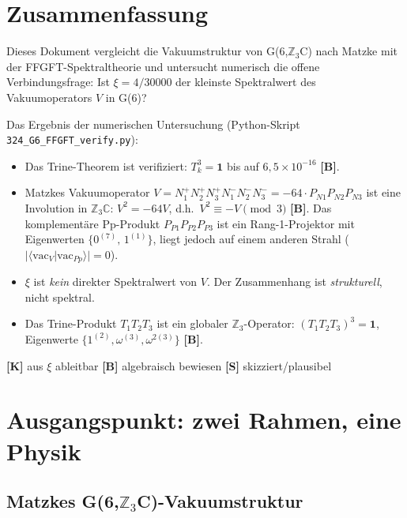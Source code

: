 \section*{Zusammenfassung}

Dieses Dokument vergleicht die Vakuumstruktur von G(6,$\mathbb{Z}_3$C) nach Matzke
mit der FFGFT-Spektraltheorie und untersucht numerisch die offene
Verbindungsfrage: Ist $\xi = 4/30000$ der kleinste Spektralwert des
Vakuumoperators $V$ in G(6)?

Das Ergebnis der numerischen Untersuchung (Python-Skript
\texttt{324\_G6\_FFGFT\_verify.py}):

\begin{itemize}
  \item Das Trine-Theorem ist verifiziert: $T_k^3 = \mathbf{1}$
    bis auf $6{,}5\times10^{-16}$ \textbf{[B]}.
  \item Matzkes Vakuumoperator $V = N_1^+N_2^+N_3^+N_1^-N_2^-N_3^- = -64\cdot P_{N1}P_{N2}P_{N3}$
    ist eine Involution in $\mathbb{Z}_3\mathbb{C}$: $V^2 = -64V$,
    d.h.\ $V^2 \equiv -V \pmod{3}$ \textbf{[B]}.
    Das komplementäre Pp-Produkt $P_{P1}P_{P2}P_{P3}$ ist ein Rang-1-Projektor
    mit Eigenwerten $\{0^{(7)},\, 1^{(1)}\}$, liegt jedoch auf einem anderen Strahl
    ($|\langle\text{vac}_V|\text{vac}_{Pp}\rangle| = 0$).
  \item $\xi$ ist \emph{kein} direkter Spektralwert von $V$.
    Der Zusammenhang ist \emph{strukturell}, nicht spektral.
  \item Das Trine-Produkt $T_1 T_2 T_3$ ist ein globaler
    $\mathbb{Z}_3$-Operator: $(T_1 T_2 T_3)^3 = \mathbf{1}$,
    Eigenwerte $\{1^{(2)}, \omega^{(3)}, \omega^{2(3)}\}$ \textbf{[B]}.
\end{itemize}

\begin{keyresult}[Statusmarkierung]
\textbf{[K]} aus $\xi$ ableitbar \quad
\textbf{[B]} algebraisch bewiesen \quad
\textbf{[S]} skizziert/plausibel
\end{keyresult}

\section{Ausgangspunkt: zwei Rahmen, eine Physik}

\subsection{Matzkes G(6,$\mathbb{Z}_3$C)-Vakuumstruktur}

